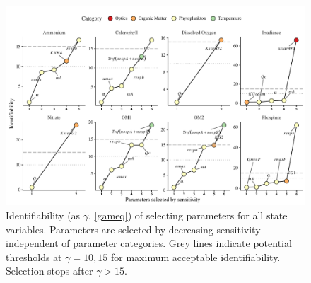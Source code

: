 \documentclass[letterpaper,12pt,oneside]{article}\usepackage[]{graphicx}\usepackage[]{color}
\newcommand{\beginsupplement}{%
        \setcounter{table}{0}
        \renewcommand{\thetable}{S\arabic{table}}%
        \setcounter{figure}{0}
        \renewcommand{\thefigure}{S\arabic{figure}}%
     }
\begin{document}
\begin{figure}[!ht]

{\centering \includegraphics[width=\textwidth]{figs/heurist_stts-1} 

}

\caption[Identifiability (as ]{Identifiability (as $\gamma$, \cref{gameq}) of selecting parameters for all state variables. Parameters are selected by decreasing sensitivity independent of parameter categories. Grey lines indicate potential thresholds at $\gamma = 10, 15$ for maximum acceptable identifiability. Selection stops after $\gamma > 15$.}\label{fig:heurist_stts}
\end{figure}


\clearpage

\beginsupplement

\end{document}
